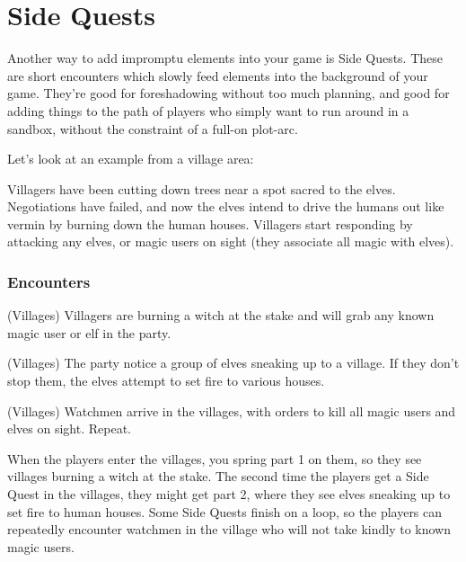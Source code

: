 \section{Side Quests}\label{sidequests}

\begin{multicols}{2}

\noindent
Another way to add impromptu elements into your game is Side Quests.
These are short encounters which slowly feed elements into the background of your game.
They're good for foreshadowing without too much planning, and good for adding things to the path of players who simply want to run around in a sandbox, without the constraint of a full-on plot-arc.

Let's look at an example from a village area:

\begin{exampletext}

	Villagers have been cutting down trees near a spot sacred to the elves.
	Negotiations have failed, and now the elves intend to drive the humans out like vermin by burning down the human houses.
	Villagers start responding by attacking any elves, or magic users on sight (they associate all magic with elves).

\end{exampletext}

\subsubsection{Encounters}

\begin{list}{\Square}{}

\item[\CheckedBox]{(Villages) Villagers are burning a witch at the stake and will grab any known magic user or elf in the party.}

\item{(Villages) The party notice a group of elves sneaking up to a village. If they don't stop them, the elves attempt to set fire to various houses.}

\item{(Villages) Watchmen arrive in the villages, with orders to kill all magic users and elves on sight. Repeat.}

\end{list}

When the players enter the villages, you spring part 1 on them, so they see villages burning a witch at the stake.
The second time the players get a Side Quest in the villages, they might get part 2, where they see elves sneaking up to set fire to human houses.
Some Side Quests finish on a loop, so the players can repeatedly encounter watchmen in the village who will not take kindly to known magic users.


\end{multicols}
